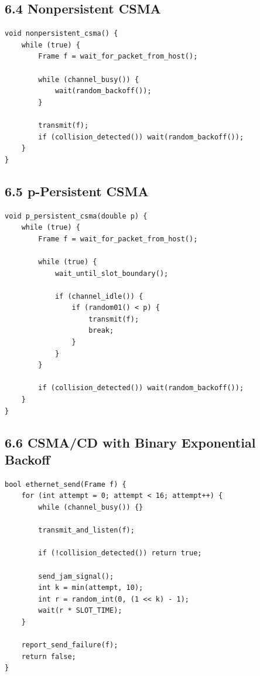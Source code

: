 \documentclass[11pt]{article}
\begin{document}
\subsection{6.4 Nonpersistent CSMA}\label{nonpersistent-csma}

\begin{verbatim}
void nonpersistent_csma() {
    while (true) {
        Frame f = wait_for_packet_from_host();

        while (channel_busy()) {
            wait(random_backoff());
        }

        transmit(f);
        if (collision_detected()) wait(random_backoff());
    }
}
\end{verbatim}

\subsection{6.5 p-Persistent CSMA}\label{p-persistent-csma}

\begin{verbatim}
void p_persistent_csma(double p) {
    while (true) {
        Frame f = wait_for_packet_from_host();

        while (true) {
            wait_until_slot_boundary();

            if (channel_idle()) {
                if (random01() < p) {
                    transmit(f);
                    break;
                }
            }
        }

        if (collision_detected()) wait(random_backoff());
    }
}
\end{verbatim}

\subsection{6.6 CSMA/CD with Binary Exponential
Backoff}\label{csmacd-with-binary-exponential-backoff}

\begin{verbatim}
bool ethernet_send(Frame f) {
    for (int attempt = 0; attempt < 16; attempt++) {
        while (channel_busy()) {}

        transmit_and_listen(f);

        if (!collision_detected()) return true;

        send_jam_signal();
        int k = min(attempt, 10);
        int r = random_int(0, (1 << k) - 1);
        wait(r * SLOT_TIME);
    }

    report_send_failure(f);
    return false;
}
\end{verbatim}
\end{document}
